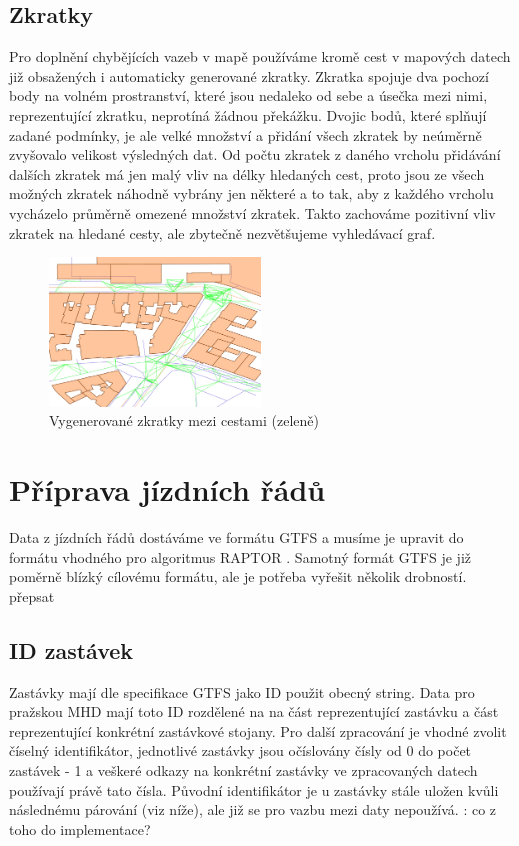 \subsection{Zkratky}
Pro doplnění chybějících vazeb v mapě používáme kromě cest v mapových datech
již obsažených i automaticky generované zkratky. Zkratka spojuje dva pochozí
body na volném prostranství, které jsou nedaleko od sebe a úsečka mezi nimi,
reprezentující zkratku, neprotíná žádnou překážku. Dvojic bodů, které splňují
zadané podmínky, je ale velké množství a přidání všech zkratek by neúměrně
zvyšovalo velikost výsledných dat. Od počtu zkratek z daného vrcholu přidávání
dalších zkratek má jen malý vliv na délky hledaných cest, proto jsou ze všech
možných zkratek náhodně vybrány jen některé a to tak, aby z každého vrcholu
vycházelo průměrně omezené množství zkratek. Takto zachováme pozitivní vliv
zkratek na hledané cesty, ale zbytečně nezvětšujeme vyhledávací graf.
\begin{figure}
  \label{fig:zkratky}
  \centering
    \includegraphics[width=0.5\textwidth]{../img/zkratky.pdf}
  \caption{Vygenerované zkratky mezi cestami (zeleně)}
\end{figure}

\section{Příprava jízdních řádů}
Data z jízdních řádů dostáváme ve formátu GTFS \cite{GTFS} a musíme je
upravit do formátu vhodného pro algoritmus RAPTOR \cite{RAPTOR}. Samotný
formát GTFS je již poměrně blízký cílovému formátu, ale je potřeba vyřešit
několik drobností. \TODO přepsat

\subsection{ID zastávek}
Zastávky mají dle specifikace GTFS jako ID použit obecný string. Data pro
pražskou MHD mají toto ID rozdělené na na část reprezentující zastávku a část
reprezentující konkrétní zastávkové stojany. Pro další zpracování je vhodné
zvolit číselný identifikátor, jednotlivé zastávky jsou očíslovány čísly od 0 do
počet zastávek - 1 a veškeré odkazy na konkrétní zastávky ve zpracovaných datech
používají právě tato čísla. Původní identifikátor je u zastávky stále uložen
kvůli následnému párování (viz níže), ale již se pro vazbu mezi daty nepoužívá.
\TODO: co z toho do implementace?

